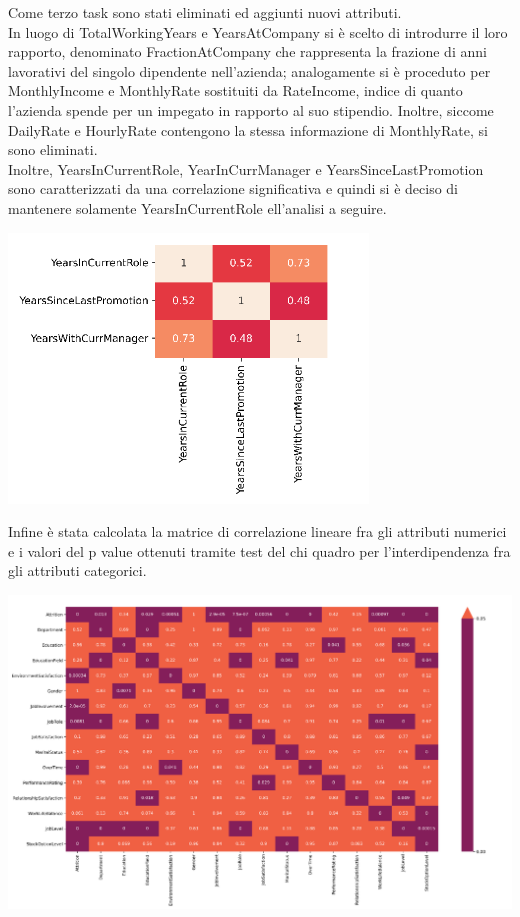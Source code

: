 \documentclass[english]{article}
\begin{document}
Come terzo task sono stati eliminati ed aggiunti nuovi attributi.\\
In luogo di TotalWorkingYears e YearsAtCompany si è scelto di introdurre il loro rapporto, denominato FractionAtCompany che rappresenta la frazione di anni lavorativi del singolo dipendente nell'azienda; analogamente si è proceduto per MonthlyIncome e MonthlyRate sostituiti da RateIncome, indice di quanto l'azienda spende per un impegato in rapporto al suo stipendio. Inoltre, siccome DailyRate e HourlyRate contengono la stessa informazione di MonthlyRate, si sono eliminati.\\
Inoltre, YearsInCurrentRole, YearInCurrManager e YearsSinceLastPromotion sono caratterizzati da una correlazione significativa e quindi si è deciso di mantenere solamente YearsInCurrentRole ell'analisi a seguire.
\begin{center}
\includegraphics[scale=0.7]{years.png}
\end{center}
Infine è stata calcolata la matrice di correlazione lineare fra gli attributi numerici e i valori del p value ottenuti tramite test del chi quadro per l'interdipendenza fra gli attributi categorici.
\begin{center}
\includegraphics[scale=1.2]{mccat.png}
\end{center}
\end{document}

